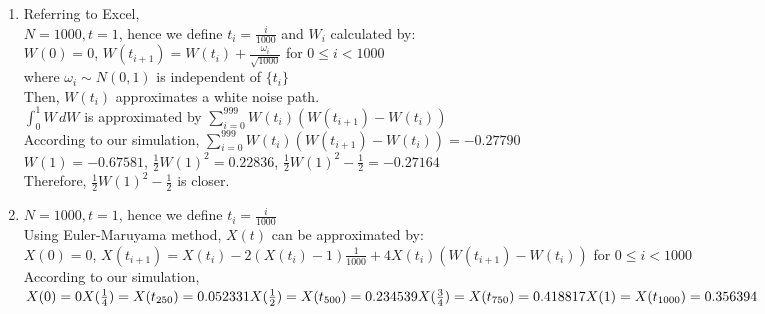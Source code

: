 \documentclass[a4paper]{article}
\def\ii{\displaystyle\int}
\begin{document}
\begin{enumerate}
\begin{enumerate}
\item
Referring to Excel,\\
$N=1000, t=1$, hence we define $t_i=\frac{i}{1000}$ and $W_i$ calculated by:\\
$W(0)=0$, $W(t_{i+1})=W(t_i)+\frac{\omega_i}{\sqrt{1000}}$ for $0\leq i<1000$\\
where $\omega_i\sim N(0,1)$ is independent of $\{t_i\}$\\
Then, $W(t_i)$ approximates a white noise path.\\
$\ii_0^1 W\,dW$ is approximated by $\displaystyle\sum_{i=0}^{999}W(t_i)(W(t_{i+1})-W(t_i))$\\
According to our simulation, $\displaystyle\sum_{i=0}^{999}W(t_i)(W(t_{i+1})-W(t_i))=-0.27790$\\
$W(1)=-0.67581$, $\frac{1}{2}W(1)^2=0.22836$, $\frac{1}{2}W(1)^2-\frac{1}{2}=-0.27164$\\
Therefore, $\frac{1}{2}W(1)^2-\frac{1}{2}$ is closer.

\item
$N=1000, t=1$, hence we define $t_i=\frac{i}{1000}$\\
Using Euler-Maruyama method, $X(t)$ can be approximated by:\\
$X(0)=0$, $X(t_{i+1})=X(t_i)-2(X(t_i)-1)\frac{1}{1000}+4X(t_i)(W(t_{i+1})-W(t_i))$ for $0\leq i<1000$\\
According to our simulation, 
$X(0)=0\\
X(\frac{1}{4})=X(t_{250})=0.052331\\
X(\frac{1}{2})=X(t_{500})=0.234539\\
X(\frac{3}{4})=X(t_{750})=0.418817\\
X(1)=X(t_{1000})=0.356394$

\end{enumerate}

\pagebreak


\end{enumerate}
\end{document}
